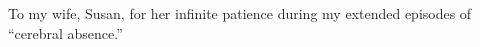 %
%
%

\begin{dedication}
To my wife, Susan, for her infinite patience during my extended
episodes of ``cerebral absence.''
\end{dedication}




